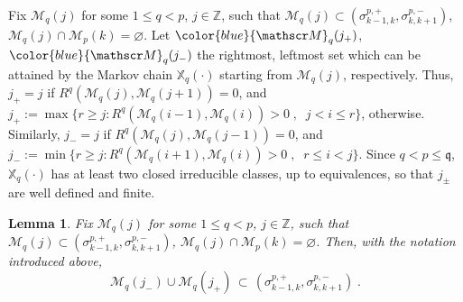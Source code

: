 \documentclass[reqno]{amsart}
\theoremstyle{plain}
\newtheorem{lemma}[theorem]{Lemma}
\theoremstyle{definition}
\newcommand{\mf}[1]{{\mathfrak #1}}
\newcommand{\bb}[1]{{\mathbb #1}}
\newcommand{\ms}[1]{{\mathscr #1}}
\newcounter{as}[section]
\newcommand{\<}{\langle}
\renewcommand{\>}{\rangle}
\begin{document}
Fix $\ms M_{q}(j)$ for some $1\le q<p$, $j \in \bb Z$, such that
$\ms M_{q}(j) \subset (\sigma^{p,+}_{k-1,k}, \sigma^{p,-}_{k,k+1})$,
$\ms M_{q}(j) \cap \ms M_{p}(k) = \varnothing$.  Let
$\color{blue} \ms M_{q}(j_+)$, $\color{blue} \ms M_{q}(j_-)$ the
rightmost, leftmost set which can be attained by the Markov chain
$\bb X_q(\cdot)$ starting from $\ms M_{q}(j)$, respectively. Thus,
$j_+ = j$ if $R^q(\ms M_{q} (j), \ms M_{q}(j+1))=0$, and
$j_+ := \max \{r \ge j : R^q(\ms M_{q}(i-1), \ms M_{q}(i))>0 \;,\;\;
j<i\le r\}$, otherwise. Similarly, $j_- = j$ if
$R^q(\ms M_{q}(j), \ms M_{q}(j-1))=0$, and
$j_- := \min \{r \ge j : R^q(\ms M_{q}(i+1), \ms M_{q}(i))>0 \;,\;\; r
\le i<j\}$.  Since $q<p\le \mf q$, $\bb X_q(\cdot)$ has at least two
closed irreducible classes, up to equivalences, so that $j_\pm$ are
well defined and finite.  

\begin{lemma}
\label{l22}
Fix $\ms M_{q}(j)$ for some $1\le q<p$,
$j \in \bb Z$, such that
$\ms M_{q}(j) \subset (\sigma^{p,+}_{k-1,k},
\sigma^{p,-}_{k,k+1})$,
$\ms M_{q}(j) \cap \ms M_{p}(k) =
\varnothing$. Then, with the notation introduced above,
\begin{equation*}
\ms M_{q}(j_-) \cup \ms M_{q}(j_+) \,\subset\,
(\sigma^{p,+}_{k-1,k}, \sigma^{p,-}_{k,k+1})\;.
\end{equation*}
\end{lemma}
\end{document}
